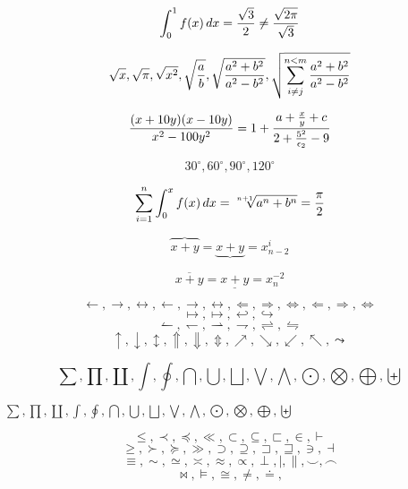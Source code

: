 
$$\int_0^1f(x)\,dx={\sqrt{3}\over2} \neq {\sqrt{2\pi}\over\sqrt{3}}$$


$$\sqrt{x}, \sqrt{\pi}, \sqrt{x^2}, \sqrt{{a \over b}}, 
\sqrt{{a^2+b^2\over a^2 -b^2}}, 
\sqrt{\sum_{i \neq j}^{n < m}{a^2+b^2\over a^2 -b^2}}
$$

$${(x+10y)(x-10y)\over x^2-100y^2} = 1 + {a+{x\over y}+c \over 2 + {5^2\over\epsilon_2}-9}$$

$$30^{\circ}, 60^{\circ}, 90^{\circ}, 120^{\circ}$$

$$\sum_{i=1}^{n} \int_0^x f(x)\,dx = \root n+1\of{a^n+b^n}
= {\pi\over 2}$$

$$\overbrace{x+y} = \underbrace{x+y} = x_{n-2}^{i}$$

$$\overline{x+y} = \underline{x+y} = x_n^{-2}$$


$$\leftarrow, \rightarrow, \leftrightarrow, 
\longleftarrow, \longrightarrow, \longleftrightarrow, 
\Leftarrow, \Rightarrow, \Leftrightarrow, 
\Longleftarrow, \Longrightarrow, \Longleftrightarrow$$
$$\mapsto, \longmapsto, \hookleftarrow, \hookrightarrow$$
$$\leftharpoonup, \leftharpoondown, \rightharpoonup, \rightharpoondown, 
\rightleftharpoons, \leftrightharpoons$$
$$\uparrow, \downarrow, \updownarrow,
\Uparrow, \Downarrow, \Updownarrow,
\nearrow, \searrow, \swarrow, \nwarrow, \leadsto$$


$$\sum, \prod, \coprod, \int, \oint, \bigcap, \bigcup, \bigsqcup,
\bigvee, \bigwedge, \bigodot, \bigotimes, \bigoplus, \biguplus$$

\centerline{
$\sum, \prod, \coprod, \int, \oint, \bigcap, \bigcup, \bigsqcup,
\bigvee, \bigwedge, \bigodot, \bigotimes, \bigoplus, \biguplus$
}


$$\leq, \prec, \preceq, \ll, \subset, \subseteq, \sqsubset, \in, \vdash$$
$$\geq, \succ, \succeq, \gg, \supset, \supseteq, \sqsupset,
\sqsupseteq, \ni, \dashv$$
$$\equiv, \sim, \simeq, \asymp, \approx, \propto, \perp, \mid,
\parallel, \smile, \frown$$ 
$$\bowtie, \models, \cong, \neq, \doteq,$$



